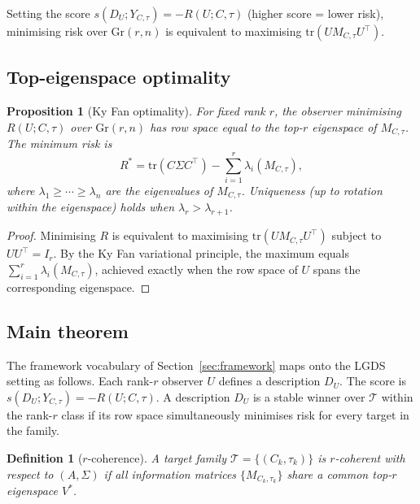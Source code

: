 \documentclass[11pt]{article}
\newtheorem{proposition}[theorem]{Proposition}
\newtheorem{definition}[theorem]{Definition}
\begin{document}
Setting the score $s(D_U; Y_{C,\tau}) = -R(U; C, \tau)$
(higher score = lower risk),
minimising risk over $\mathrm{Gr}(r,n)$ is equivalent to maximising
$\mathrm{tr}(U M_{C,\tau} U^\top)$.

\subsection{Top-eigenspace optimality}

\begin{proposition}[Ky Fan optimality]
\label{prop:ky-fan}
For fixed rank $r$, the observer minimising $R(U; C, \tau)$ over
$\mathrm{Gr}(r,n)$ has row space equal to the top-$r$ eigenspace of
$M_{C,\tau}$.
The minimum risk is
\begin{equation}
    R^* = \mathrm{tr}(C\Sigma C^\top) - \sum_{i=1}^{r} \lambda_i(M_{C,\tau}),
\end{equation}
where $\lambda_1 \geq \cdots \geq \lambda_n$ are the eigenvalues of
$M_{C,\tau}$.
Uniqueness (up to rotation within the eigenspace) holds when
$\lambda_r > \lambda_{r+1}$.
\end{proposition}

\begin{proof}
Minimising $R$ is equivalent to maximising
$\mathrm{tr}(U M_{C,\tau} U^\top)$ subject to $UU^\top = I_r$.
By the Ky Fan variational principle, the maximum equals
$\sum_{i=1}^r \lambda_i(M_{C,\tau})$,
achieved exactly when the row space of $U$ spans the corresponding eigenspace.
\end{proof}

\subsection{Main theorem}

The framework vocabulary of Section~\ref{sec:framework} maps onto the LGDS
setting as follows.
Each rank-$r$ observer $U$ defines a description $D_U$.
The score is $s(D_U; Y_{C,\tau}) = -R(U; C, \tau)$.
A description $D_U$ is a stable winner over $\mathcal{T}$ within the
rank-$r$ class if its row space simultaneously minimises risk for every
target in the family.

\begin{definition}[$r$-coherence]
\label{def:r-coherence}
A target family $\mathcal{T} = \{(C_k, \tau_k)\}$ is \emph{$r$-coherent}
with respect to $(A, \Sigma)$ if all information matrices
$\{M_{C_k, \tau_k}\}$ share a common top-$r$ eigenspace $V^*$.
\end{definition}
\end{document}
